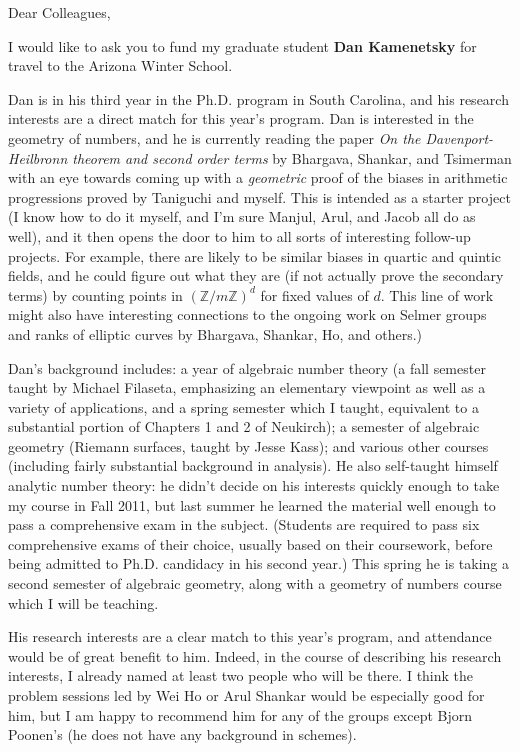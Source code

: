 \documentclass[11pt]{article}
\begin{document}
\pagestyle{fancy}

\enlargethispage{\baselineskip}

\vskip 10pt
Dear Colleagues,
\vskip 10pt

I would like to ask you to fund my graduate student {\bf Dan Kamenetsky} for travel to the Arizona Winter
School. 

Dan is in his third year in the Ph.D. program in South Carolina, and his research interests are a direct
match for this year's program. Dan is interested in the geometry of numbers, and he is currently reading
the paper {\itshape On the Davenport-Heilbronn theorem and second order terms} by Bhargava, Shankar, and Tsimerman
with an eye towards coming up with a {\itshape geometric} proof of the biases in arithmetic progressions
proved by Taniguchi and myself. This is intended as a starter project (I know how to do it myself, and I'm sure
Manjul, Arul, and Jacob all do as well), and it then opens the door to him to all sorts of interesting
follow-up projects. For example, there are likely to be similar biases in quartic and quintic fields, and he
could figure out what they are (if not actually prove the secondary terms) by counting points in
$(\mathbb{Z} / m \mathbb{Z})^d$ for fixed values of $d$. This line of work might also have interesting connections
to the ongoing work on Selmer groups and ranks of elliptic curves by Bhargava, Shankar, Ho, and others.)

Dan's background includes: a year of algebraic number theory (a fall semester taught by Michael Filaseta, emphasizing
an elementary viewpoint as well as a variety of applications, and a spring semester which I taught,
equivalent to a substantial portion of Chapters 1 and 2 of Neukirch); a semester of algebraic geometry
(Riemann surfaces, taught by Jesse Kass); and various other courses (including fairly substantial background
in analysis). He also self-taught himself analytic number theory: he didn't decide on his interests quickly
enough to take my course in Fall 2011, but last summer he learned the material well enough to pass a
comprehensive exam in the subject. (Students are required to pass six comprehensive exams of their choice, 
usually based on their coursework, before being admitted to Ph.D. candidacy in his second year.) This spring
he is taking a second semester of algebraic geometry, along with a geometry of numbers course which I will
be teaching.

His research interests are a clear match to this year's program, and attendance would be of great benefit to him.
Indeed, in the course of describing his research interests, I already named at least two people who will be
there.
I think the problem sessions led by Wei Ho or Arul Shankar would be especially good for him, but I am happy
to recommend him for any of the groups except Bjorn Poonen's (he does not have any background in schemes).
\end{document}
